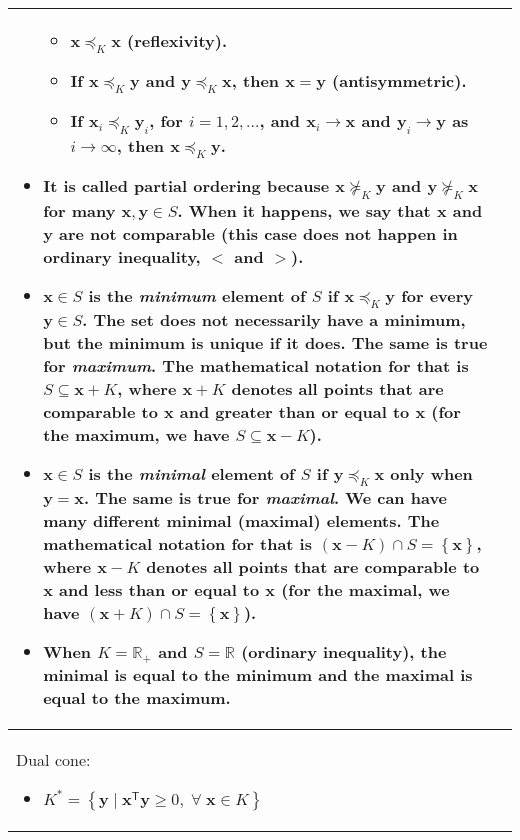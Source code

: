 \documentclass{article}
\begin{document}
\begin{table}[ht!]
\begin{tabularx}{\textwidth}{|A|C|}
\begin{itemize}[leftmargin=*]
\begin{itemize}[label={$\triangleright$}]
            \item \(\mathbf{x}\preceq_K \mathbf{x}\) (reflexivity).
            \item If \(\mathbf{x}\preceq_K \mathbf{y}\) and \(\mathbf{y}\preceq_K \mathbf{x}\), then \(\mathbf{x} = \mathbf{y}\) (antisymmetric).
            \item If \(\mathbf{x}_i\preceq_K \mathbf{y}_i\), for \(i = 1, 2, \dots\), and \(\mathbf{x}_i \rightarrow \mathbf{x}\) and \(\mathbf{y}_i \rightarrow \mathbf{y}\) as \(i \rightarrow \infty\), then \(\mathbf{x} \preceq_K \mathbf{y}\).
        \end{itemize}
    \item It is called partial ordering because \(\mathbf{x} \nsucceq_K \mathbf{y}\) and \(\mathbf{y} \nsucceq_K \mathbf{x}\) for many \(\mathbf{x}, \mathbf{y} \in S\). When it happens, we say that \(\mathbf{x}\) and \(\mathbf{y}\) are not comparable (this case does not happen in ordinary inequality, \(<\) and \(>\)).
    \item \(\mathbf{x} \in S\) is the \emph{minimum} element of \(S\) if \(\mathbf{x} \preceq_K \mathbf{y}\) for every \(\mathbf{y} \in S\). The set does not necessarily have a minimum, but the minimum is unique if it does. The same is true for \emph{maximum}. The mathematical notation for that is \(S \subseteq \mathbf{x} + K\), where \(\mathbf{x} + K\) denotes all points that are comparable to \(\mathbf{x}\) and greater than or equal to \(\mathbf{x}\) (for the maximum, we have \(S \subseteq \mathbf{x} - K\)).
    \item \(\mathbf{x} \in S\) is the \emph{minimal} element of \(S\) if \(\mathbf{y} \preceq_K \mathbf{x}\) only when \(\mathbf{y} = \mathbf{x}\). The same is true for \emph{maximal}. We can have many different minimal (maximal) elements. The mathematical notation for that is \((\mathbf{x} - K) \cap S = \left\{ \mathbf{x} \right\}\), where \(\mathbf{x} - K\) denotes all points that are comparable to \(\mathbf{x}\) and less than or equal to \(\mathbf{x}\) (for the maximal, we have \((\mathbf{x} + K) \cap S = \left\{ \mathbf{x} \right\}\)).
    \item When \(K = \mathbb{R}_{+}\) and \(S = \mathbb{R}\) (ordinary inequality), the minimal is equal to the minimum and the maximal is equal to the maximum.
\end{itemize} \\
\hline
Dual cone:
\begin{itemize}
    \item \(K^* = \left\{ \mathbf{y}\mid \mathbf{x}^\mathsf{T}\mathbf{y} \geq 0, \;\forall\; \mathbf{x} \in K \right\}\)

\end{itemize}
\end{tabularx}
\end{table}
\end{document}
